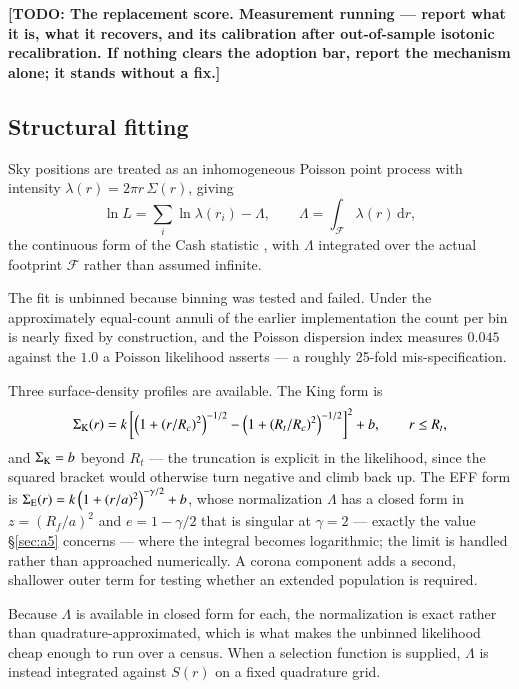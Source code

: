\documentclass{aa}
\newcommand{\TODO}[1]{\textbf{[TODO: #1]}}
\begin{document}
\TODO{The replacement score. Measurement running --- report what it is, what it recovers, and
its calibration after out-of-sample isotonic recalibration. If nothing clears the adoption bar,
report the mechanism alone; it stands without a fix.}

\subsection{Structural fitting}
\label{sec:structure}

Sky positions are treated as an inhomogeneous Poisson point process with intensity
$\lambda(r) = 2\pi r\,\Sigma(r)$, giving
\begin{equation}
  \ln L = \sum_i \ln \lambda(r_i) - \Lambda, \qquad
  \Lambda = \int_{\mathcal{F}} \lambda(r)\,\mathrm{d}r ,
\end{equation}
the continuous form of the Cash statistic \citep{cash1979}, with $\Lambda$ integrated over the
actual footprint $\mathcal{F}$ rather than assumed infinite.

The fit is unbinned because binning was tested and failed. Under the approximately equal-count
annuli of the earlier implementation the count per bin is nearly fixed by construction, and the
Poisson dispersion index measures $0.045$ against the $1.0$ a Poisson likelihood asserts
--- a roughly 25-fold mis-specification.

Three surface-density profiles are available. The King form is
\begin{equation}
  \Sigma_{\rm K}(r) = k\left[\left(1 + (r/R_c)^2\right)^{-1/2}
                           - \left(1 + (R_t/R_c)^2\right)^{-1/2}\right]^2 + b ,
  \qquad r \le R_t ,
\end{equation}
and $\Sigma_{\rm K} = b$ beyond $R_t$ --- the truncation is explicit in the likelihood, since the
squared bracket would otherwise turn negative and climb back up. The EFF form is
$\Sigma_{\rm E}(r) = k\left(1 + (r/a)^2\right)^{-\gamma/2} + b$, whose normalization
$\Lambda$ has a closed form in $z = (R_f/a)^2$ and $e = 1 - \gamma/2$ that is singular at
$\gamma = 2$ --- exactly the value \S\ref{sec:a5} concerns --- where the integral becomes
logarithmic; the limit is handled rather than approached numerically. A corona component adds a
second, shallower outer term for testing whether an extended population is required.

Because $\Lambda$ is available in closed form for each, the normalization is exact rather than
quadrature-approximated, which is what makes the unbinned likelihood cheap enough to run over a
census. When a selection function is supplied, $\Lambda$ is instead integrated against
$S(r)$ on a fixed quadrature grid.
\end{document}
